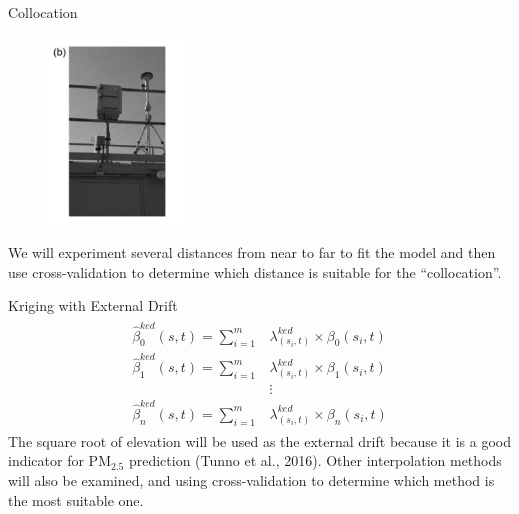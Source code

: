 \documentclass{beamer}
\begin{document}
\begin{frame}{Collocation}
    \label{frm:col}
    \begin{figure}
        \centering
        \includegraphics[width=0.32\textwidth]{img/appendix/Aim2/collocation.png}
    \end{figure}
    We will experiment several distances from near to far to fit the model and then use cross-validation to determine which distance is suitable for the ``collocation''.
\end{frame}

\begin{frame}{Kriging with External Drift}
    \begin{align*}
        \begin{split}
        \hat{\beta}^{ked}_0(s,t)=\sum_{i=1}^m&\lambda^{ked}_{(s_i,t)}\times\beta_0(s_i,t) \\
        \hat{\beta}^{ked}_1(s,t)=\sum_{i=1}^m&\lambda^{ked}_{(s_i,t)}\times\beta_1(s_i,t) \\
        &\vdots \\
        \hat{\beta}^{ked}_n(s,t)=\sum_{i=1}^m&\lambda^{ked}_{(s_i,t)}\times\beta_n(s_i,t) 
        \end{split}
    \end{align*}
    \textcolor[rgb]{0.1,0.1,0.6}{\small The square root of elevation will be used as the external drift because it is a good indicator for PM$_{2.5}$ prediction (Tunno et al., 2016). Other interpolation methods will also be examined, and using cross-validation to determine which method is the most suitable one.}
\end{frame}
\end{document}
